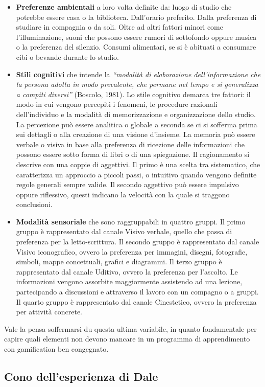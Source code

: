 \begin{itemize}
  \item \textbf{Preferenze ambientali} a loro volta definite da: luogo di studio che potrebbe essere casa o la biblioteca. Dall'orario preferito. Dalla preferenza di studiare in compagnia o da soli. Oltre ad altri fattori minori come l'illuminazione, suoni che possono essere rumori di sottofondo oppure musica o la preferenza del silenzio. Consumi alimentari, se si è abituati a consumare cibi o bevande durante lo studio.
  \item \textbf{Stili cognitivi} che intende la \textit{“modalità di elaborazione dell’informazione che la persona adotta in modo prevalente, che permane nel tempo e si generalizza a compiti diversi”} (Boscolo, 1981).
  Lo stile cognitivo demarca tre fattori: il modo in cui vengono percepiti i fenomeni, le procedure razionali dell'individuo e la modalità di memorizzazione e organizzazione dello studio.
  La percezione può essere analitica o globale a seconda se ci si sofferma prima sui dettagli o alla creazione di una visione d'insieme.
  La memoria può essere verbale o visiva in base alla preferenza di ricezione delle informazioni che possono essere sotto forma di libri o di una spiegazione.
  Il ragionamento si descrive con una coppie di aggettivi. Il primo è una scelta tra sistematico, che caratterizza un approccio a piccoli passi, o intuitivo quando vengono definite regole generali sempre valide. Il secondo aggettivo può essere impulsivo oppure riflessivo, questi indicano la velocità con la quale si traggono conclusioni.
  \item \textbf{Modalità sensoriale} che sono raggruppabili in quattro gruppi. Il primo gruppo è rappresentato dal canale Visivo verbale, quello che passa di preferenza per la letto-scrittura. Il secondo gruppo è rappresentato dal canale Visivo iconografico, ovvero la preferenza per immagini, disegni, fotografie, simboli, mappe concettuali, grafici e diagrammi. Il terzo gruppo è rappresentato dal canale Uditivo, ovvero la preferenza per l’ascolto. Le informazioni vengono assorbite maggiormente assistendo ad una lezione, partecipando a discussioni e attraverso il lavoro con un compagno o a gruppi. Il quarto gruppo è rappresentato dal canale Cinestetico, ovvero la preferenza per attività concrete.
\end{itemize}
Vale la pensa soffermarsi du questa ultima variabile, in quanto fondamentale per capire quali elementi non devono mancare in un programma di apprendimento con gamification ben congegnato.
\subsection{Cono dell'esperienza di Dale}

